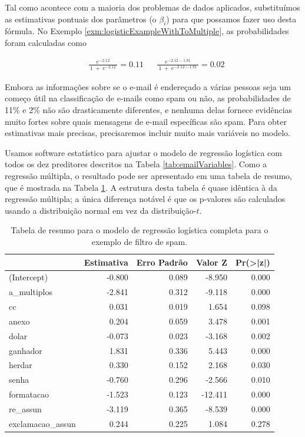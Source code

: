 \documentclass[
]{book}
\theoremstyle{definition}
\theoremstyle{definition}
\theoremstyle{definition}
\theoremstyle{definition}
\theoremstyle{remark}
\begin{document}
Tal como acontece com a maioria dos problemas de dados aplicados, substituímos as estimativas pontuais dos parâmetros (o \(\beta_i\)) para que possamos fazer uso desta fórmula. No Exemplo \ref{exm:logisticExampleWithToMultiple}, as probabilidades foram calculadas como

\begin{align*}
&\frac{\ e^{-2.12}\ }{\ 1\ +\ e^{-2.12}\ } = 0.11 && \frac{\ e^{-2.12 - 1.81}\ }{\ 1\ +\ e^{-2.12 - 1.81}\ } = 0.02
\end{align*}

Embora as informações sobre se o e-mail é endereçado a várias pessoas seja um começo útil na classificação de e-mails como spam ou não, as probabilidades de 11\% e 2\% não são drasticamente diferentes, e nenhuma delas fornece evidências muito fortes sobre quais mensagens de e-mail específicas são spam. Para obter estimativas mais precisas, precisaremos incluir muito mais variáveis no modelo.

Usamos software estatístico para ajustar o modelo de regressão logística com todos os dez preditores descritos na Tabela \ref{tab:emailVariables}. Como a regressão múltipla, o resultado pode ser apresentado em uma tabela de resumo, que é mostrada na Tabela \ref{tab:emailLogisticModelResults}. A estrutura desta tabela é quase idêntica à da regressão múltipla; a única diferença notável é que os p-valores são calculados usando a distribuição normal em vez da distribuição-\(t\).

\begin{table}

\caption{\label{tab:emailLogisticModelResults}Tabela de resumo para o modelo de regressão logística completa para o exemplo de filtro de spam.}
\centering
\begin{tabular}[t]{l|r|r|r|r}
\hline
  & Estimativa & Erro Padrão & Valor Z & Pr(>|z|)\\
\hline
(Intercept) & -0.800 & 0.089 & -8.950 & 0.000\\
\hline
a\_multiplos & -2.841 & 0.312 & -9.118 & 0.000\\
\hline
cc & 0.031 & 0.019 & 1.654 & 0.098\\
\hline
anexo & 0.204 & 0.059 & 3.478 & 0.001\\
\hline
dolar & -0.073 & 0.023 & -3.168 & 0.002\\
\hline
ganhador & 1.831 & 0.336 & 5.443 & 0.000\\
\hline
herdar & 0.330 & 0.152 & 2.168 & 0.030\\
\hline
senha & -0.760 & 0.296 & -2.566 & 0.010\\
\hline
formatacao & -1.523 & 0.123 & -12.411 & 0.000\\
\hline
re\_assun & -3.119 & 0.365 & -8.539 & 0.000\\
\hline
exclamacao\_assun & 0.244 & 0.225 & 1.084 & 0.278\\
\hline
\end{tabular}
\end{table}
\end{document}
